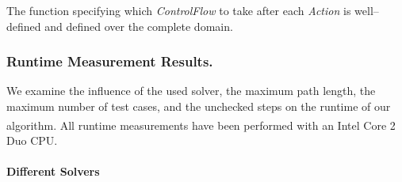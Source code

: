 \documentclass[runningheads,a4paper]{llncs}%
\newcommand{\UMLType}[1]{\textsf{\textit{#1}}} %
\begin{document}
The function specifying which \UMLType{ControlFlow} to take after each
\UMLType{Action} is well--defined and defined over the complete domain.
\subsubsection{Runtime Measurement Results.}
We examine the influence of the used solver, the maximum path length, the
maximum number of test cases, and the unchecked steps on the runtime of our
algorithm. All runtime measurements have been performed with an
Intel\textsuperscript{\textregistered} Core\textsuperscript{\texttrademark} 2
Duo CPU.%
\paragraph{Different Solvers}%
\end{document}
